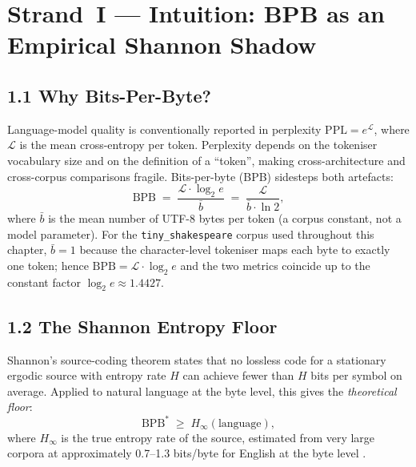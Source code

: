 \section{Strand~I — Intuition: BPB as an Empirical Shannon Shadow}
\label{sec:ch25-intuition}

\subsection{1.1 Why Bits-Per-Byte?}
\label{subsec:ch25-why-bpb}

Language-model quality is conventionally reported in perplexity
\(\mathrm{PPL} = e^{\mathcal{L}}\), where \(\mathcal{L}\) is the
mean cross-entropy per token.  Perplexity depends on the tokeniser
vocabulary size and on the definition of a ``token'', making
cross-architecture and cross-corpus comparisons fragile.
Bits-per-byte (BPB) sidesteps both artefacts:
%
\begin{equation}
  \mathrm{BPB} \;=\; \frac{\mathcal{L} \cdot \log_2 e}{\bar{b}}
  \;=\; \frac{\mathcal{L}}{\bar{b} \cdot \ln 2},
  \label{eq:bpb-def}
\end{equation}
%
where $\bar{b}$ is the mean number of UTF-8 bytes per token (a corpus
constant, not a model parameter).  For the \texttt{tiny\_shakespeare}
corpus used throughout this chapter, $\bar{b} = 1$ because the
character-level tokeniser maps each byte to exactly one token; hence
$\mathrm{BPB} = \mathcal{L} \cdot \log_2 e$ and the two metrics
coincide up to the constant factor $\log_2 e \approx 1.4427$.

\subsection{1.2 The Shannon Entropy Floor}
\label{subsec:ch25-shannon-floor}

Shannon's source-coding theorem \citep{shannon_mathematical} states
that no lossless code for a stationary ergodic source with entropy
rate $H$ can achieve fewer than $H$ bits per symbol on average.
Applied to natural language at the byte level, this gives the
\emph{theoretical floor}:
%
\begin{equation}
  \mathrm{BPB}^* \;\ge\; H_\infty(\text{language}),
  \label{eq:bpb-floor}
\end{equation}
%
where $H_\infty$ is the true entropy rate of the source, estimated
from very large corpora at approximately 0.7–1.3 bits/byte for
English at the byte level \citep{cover_thomas_info}.

